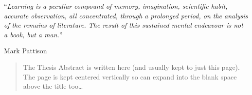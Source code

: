 \documentclass[
11pt, %
english, %
singlespacing, %
headsepline, %
]{MastersDoctoralThesis} %
\begin{document}
\cleardoublepage


\vspace*{0.2\textheight}

\noindent\enquote{\itshape Learning is a peculiar compound of memory, imagination, scientific habit,
accurate observation, all concentrated, through a prolonged period, on the
analysis of the remains of literature. The result of this sustained mental
endeavour is not a book, but a man.}\bigbreak

\hfill Mark Pattison


\begin{abstract}
\addchaptertocentry{\abstractname} %
The Thesis Abstract is written here (and usually kept to just this page). The page is kept centered vertically so can expand into the blank space above the title too\ldots
\end{abstract}

\end{document}
